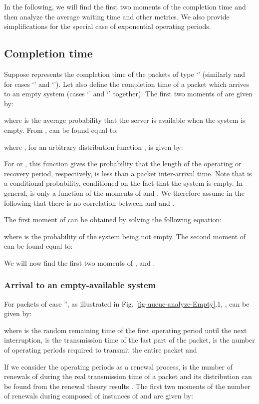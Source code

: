\documentclass[11pt,journal,oneside,onecolumn,draftclsnofoot]{IEEEtran}
\begin{document}
In the following, we will find the first two moments of the completion time  and then analyze the average waiting time and other metrics. We also provide simplifications for the special case of exponential operating periods.
 

\subsection{Completion time}

Suppose  represents the completion time of the packets of type `' (similarly  and  for cases `' and `'). Let also  define the completion time of a packet which arrives to an empty system (cases `' and `' together). The first two moments of  are given by:

where  is the average probability that the server is available when the system is empty. From \cite{federgruen86},  can be found equal to:

where , for an arbitrary distribution function , is given by:

For  or , this function gives the probability that the length of the operating or recovery period, respectively, is less than a packet inter-arrival time. Note that  is a conditional probability, conditioned on the fact that the system is empty. In general,  is only a function of the  moments of  and . We therefore assume in the following that there is no correlation between  and  and .  

The first moment of  can be obtained by solving the following equation: 

where  is the probability of the system being not empty.
The second moment of  can be found equal to:

We will now find the first two moments of ,  and .

\subsubsection{Arrival to an empty-available system}
For packets of case '', as illustrated in Fig. \ref{fig-queue-analyze-Empty}.1, , can be given by: 

where  is the random remaining time of the first operating period until the next interruption,  is the transmission time of the last part of the packet,  is the number of operating periods required to transmit the entire packet and


If we consider the operating periods  as a renewal process,  is the number of renewals of  during the real transmission time of a packet and  its distribution can be found from the renewal theory results \cite{cox62,ross06}. The first two moments of the number of renewals during  composed of instances of  and  are given by:
\end{document}
